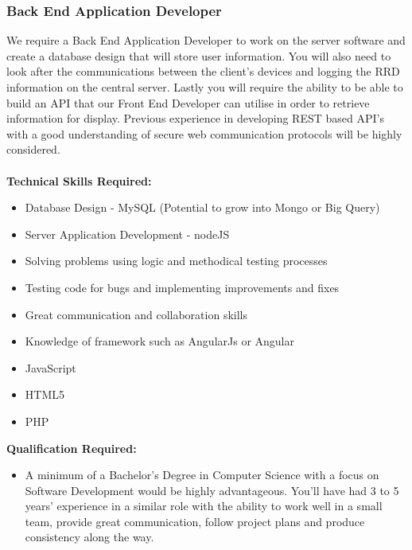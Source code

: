 \documentclass[11pt, oneside, a4paper, titlepage]{article}
\begin{document}
\subsubsection{Back End Application Developer}
We require a Back End Application Developer to work on the server software and create a database design that will store user information. You will also need to look after the communications between the client’s devices and logging the RRD information on the central server. Lastly you will require the ability to be able to build an API that our Front End Developer can utilise in order to retrieve information for display. Previous experience in developing REST based API’s with a good understanding of secure web communication protocols will be highly considered.  
\\
\\
\textbf{Technical Skills Required:}
\begin{itemize}
	\item Database Design - MySQL (Potential to grow into Mongo or Big Query)
	\item Server Application Development - nodeJS
	\item Solving problems using logic and methodical testing processes
	\item Testing code for bugs and implementing improvements and fixes
	\item Great communication and collaboration skills
	\item Knowledge of framework such as AngularJs or Angular
	\item JavaScript
	\item HTML5
	\item PHP
\end{itemize}
\hfill \break
\textbf{Qualification Required:}
\begin{itemize}
	\item A minimum of a Bachelor's Degree in Computer Science with a focus on Software Development would be highly advantageous. You’ll have had 3 to 5 years' experience in a similar role with the ability to work well in a small team, provide great communication, follow project plans and produce consistency along the way. 
\end{itemize}
\newpage
\end{document}
